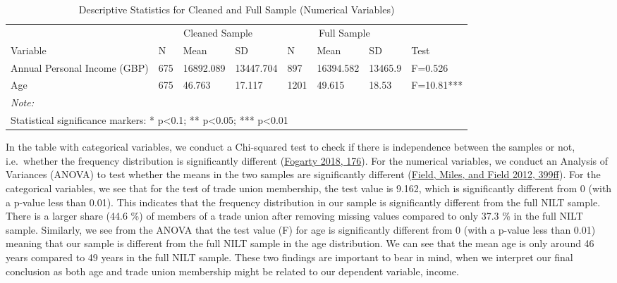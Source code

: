\documentclass[
]{article}
\begin{document}
\begin{table}[H]

\caption{\label{tab:unnamed-chunk-1}Descriptive Statistics for Cleaned and Full Sample (Numerical Variables)}
\centering
\begin{tabular}[t]{llllllll}
\toprule
\multicolumn{1}{c}{ } & \multicolumn{3}{c}{Cleaned Sample} & \multicolumn{3}{c}{Full Sample} & \multicolumn{1}{c}{ } \\
\cmidrule(l{3pt}r{3pt}){2-4} \cmidrule(l{3pt}r{3pt}){5-7}
Variable & N & Mean & SD & N & Mean & SD & Test\\
\midrule
Annual Personal Income (GBP) & 675 & 16892.089 & 13447.704 & 897 & 16394.582 & 13465.9 & F=0.526\\
Age & 675 & 46.763 & 17.117 & 1201 & 49.615 & 18.53 & F=10.81***\\
\bottomrule
\multicolumn{8}{l}{\rule{0pt}{1em}\textit{Note: }}\\
\multicolumn{8}{l}{\rule{0pt}{1em}Statistical significance markers: * p<0.1; ** p<0.05; *** p<0.01}\\
\end{tabular}
\end{table}

In the table with categorical variables, we conduct a Chi-squared test
to check if there is independence between the samples or not,
i.e.~whether the frequency distribution is significantly different
(\protect\hyperlink{ref-fogarty2018quantitative}{Fogarty 2018, 176}).
For the numerical variables, we conduct an Analysis of Variances (ANOVA)
to test whether the means in the two samples are significantly different
(\protect\hyperlink{ref-field2012discovering}{Field, Miles, and Field
2012, 399ff}). For the categorical variables, we see that for the test
of trade union membership, the test value is 9.162, which is
significantly different from 0 (with a p-value less than 0.01). This
indicates that the frequency distribution in our sample is significantly
different from the full NILT sample. There is a larger share (44.6 \%)
of members of a trade union after removing missing values compared to
only 37.3 \% in the full NILT sample. Similarly, we see from the ANOVA
that the test value (F) for age is significantly different from 0 (with
a p-value less than 0.01) meaning that our sample is different from the
full NILT sample in the age distribution. We can see that the mean age
is only around 46 years compared to 49 years in the full NILT sample.
These two findings are important to bear in mind, when we interpret our
final conclusion as both age and trade union membership might be related
to our dependent variable, income.
\end{document}
